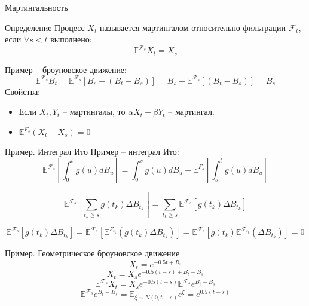 \documentclass{beamer}
\begin{document}
%
%
%
\begin{frame}{Мартингальность}
    \begin{block}{Определение}
        Процесс $X_t$ называется мартингалом относительно фильтрации $\mathcal{F}_t$, если $\forall s < t$ выполнено:
        $$
            \mathbb{E}^{\mathcal{F}_s} X_t = X_s
        $$
    \end{block}
     
    Пример -- броуновское движение:
    $$
        \mathbb{E}^{\mathcal{F}_s} B_t
        = \mathbb{E}^{\mathcal{F}_s} \left[ B_s + (B_t - B_s) \right]
        = B_s + \mathbb{E}^{\mathcal{F}_s} \left[ (B_t - B_s) \right] = B_s
    $$ 
    Свойства:
    \begin{itemize}
        \item Если $X_t, Y_t$ -- мартингалы, то $\alpha X_t + \beta Y_t$ -- мартингал.
        \item $\mathbb{E}^{F_s} (X_t - X_s) = 0$
    \end{itemize}
\end{frame}

\begin{frame}{Пример. Интеграл Ито}
    Пример -- интеграл Ито:
    $$
        \mathbb{E}^{\mathcal{F}_s} \left[ \int_0^t g(u) dB_u\right]= 
        \int_0^s g(u) dB_u + \mathbb{E}^{F_s} \left[\int_s^t g(u) dB_u\right]
    $$
     
    $$
        \mathbb{E}^{\mathcal{F}_s} \left[ \sum_{t_k \geq s} g(t_k) \Delta B_{t_k}\right]
        = \sum_{t_k \geq s} \mathbb{E}^{\mathcal{F}_s} \left[g(t_k) \Delta B_{t_k} \right]
    $$
     
    $$
        \mathbb{E}^{\mathcal{F}_s} \left[g(t_k) \Delta B_{t_k} \right]
        = \mathbb{E}^{\mathcal{F}_s} \left[
        \mathbb{E}^{F_{t_k}} \left(g(t_k) \Delta B_{t_k}\right) \right] = \mathbb{E}^{\mathcal{F}_s} \left[ g(t_k) \mathbb{E}^{\mathcal{F}_{t_k}} \left(\Delta B_{t_k}\right) \right]= 0
    $$
    
\end{frame}

\begin{frame}{Пример. Геометрическое броуновское движение}
    $$X_t = e^{-0.5 t + B_t}
    $$ 
    $$X_t = X_s e^{-0.5 (t - s) + B_t - B_s}
    $$ 
    $$\mathbb{E}^{\mathcal{F}_s} X_t = X_s e^{-0.5(t-s)}\mathbb{E}^{\mathcal{F}_s} e^{B_t - B_s}
    $$ 
    $$\mathbb{E}^{\mathcal{F}_s} e^{B_t - B_s} = \mathbb{E}_{\xi \sim N(0, t-s)} e^{\xi} = e^{0.5(t-s)}
    $$
\end{frame}
\end{document}
